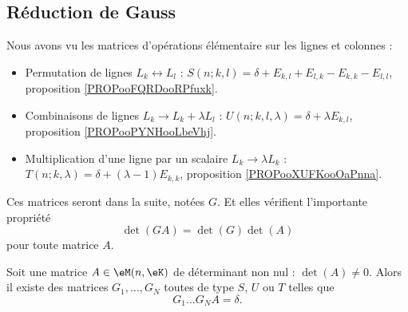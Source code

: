 \subsection{Réduction de Gauss}

Nous avons vu les matrices d'opérations élémentaire sur les lignes et colonnes :
\begin{itemize}
	\item Permutation de lignes \( L_k\leftrightarrow L_l\)  : \( S(n;k,l)=\delta+E_{k,l}+E_{l,k}-E_{k,k}-E_{l,l}\), proposition \ref{PROPooFQRDooRPfuxk}.
	\item Combinaisons de lignes \( L_k\to L_k+\lambda L_l\) : \( U(n;k,l,\lambda)=\delta+\lambda E_{k,l}\), proposition \ref{PROPooPYNHooLbeVhj}.
	\item Multiplication d'une ligne par un scalaire \( L_k\to \lambda L_k\) : \( T(n;k,\lambda)=\delta+(\lambda-1)E_{k,k}\), proposition \ref{PROPooXUFKooOaPnna}.
\end{itemize}

Ces matrices seront dans la suite, notées \( G\). Et elles vérifient l'importante propriété
\begin{equation}        \label{EQooLQTVooBYjVYl}
	\det(GA)=\det(G)\det(A)
\end{equation}
pour toute matrice \( A\).

\begin{proposition}        \label{PROPooJBTZooNLobpf}
	Soit une matrice \( A\in \eM(n,\eK)\) de déterminant non nul : \( \det(A)\neq 0\). Alors il existe des matrices \( G_1,\ldots, G_N\) toutes de type \( S\), \( U\) ou \( T\) telles que
	\begin{equation}
		G_1\ldots G_NA=\delta.
	\end{equation}
\end{proposition}

